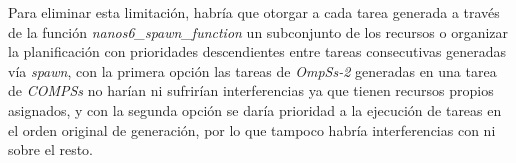 \par\bigskip

Para eliminar esta limitación, habría que otorgar a cada tarea generada a través de la función \textit{nanos6\_spawn\_function} un subconjunto de los recursos o organizar la planificación con prioridades descendientes entre tareas consecutivas generadas vía \textit{spawn}, con la primera opción las tareas de \textit{OmpSs-2} generadas en una tarea de \textit{COMPSs} no harían ni sufrirían interferencias ya que tienen recursos propios asignados, y con la segunda opción se daría prioridad a la ejecución de tareas en el orden original de generación, por lo que tampoco habría interferencias con ni sobre el resto.


